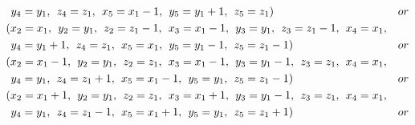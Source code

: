 \begin{align*}
&\hspace{1ex} y_{4}=y_{1},\hspace{1ex} z_{4}=z_{1},\hspace{1ex} x_{5}=x_{1}-1,\hspace{1ex} y_{5}=y_{1}+1,\hspace{1ex} z_{5}=z_{1})&or\\ 
&(x_{2}=x_{1},\hspace{1ex} y_{2}=y_{1},\hspace{1ex} z_{2}=z_{1}-1,\hspace{1ex} x_{3}=x_{1}-1,\hspace{1ex} y_{3}=y_{1},\hspace{1ex} z_{3}=z_{1}-1,\hspace{1ex} x_{4}=x_{1},\\
&\hspace{1ex} y_{4}=y_{1}+1,\hspace{1ex} z_{4}=z_{1},\hspace{1ex} x_{5}=x_{1},\hspace{1ex} y_{5}=y_{1}-1,\hspace{1ex} z_{5}=z_{1}-1)&or\\ 
&(x_{2}=x_{1}-1,\hspace{1ex} y_{2}=y_{1},\hspace{1ex} z_{2}=z_{1},\hspace{1ex} x_{3}=x_{1}-1,\hspace{1ex} y_{3}=y_{1}-1,\hspace{1ex} z_{3}=z_{1},\hspace{1ex} x_{4}=x_{1},\\
&\hspace{1ex} y_{4}=y_{1},\hspace{1ex} z_{4}=z_{1}+1,\hspace{1ex} x_{5}=x_{1}-1,\hspace{1ex} y_{5}=y_{1},\hspace{1ex} z_{5}=z_{1}-1)&or\\ 
&(x_{2}=x_{1}+1,\hspace{1ex} y_{2}=y_{1},\hspace{1ex} z_{2}=z_{1},\hspace{1ex} x_{3}=x_{1}+1,\hspace{1ex} y_{3}=y_{1}-1,\hspace{1ex} z_{3}=z_{1},\hspace{1ex} x_{4}=x_{1},\\
&\hspace{1ex} y_{4}=y_{1},\hspace{1ex} z_{4}=z_{1}-1,\hspace{1ex} x_{5}=x_{1}+1,\hspace{1ex} y_{5}=y_{1},\hspace{1ex} z_{5}=z_{1}+1)&or\\ 

\end{align*}
